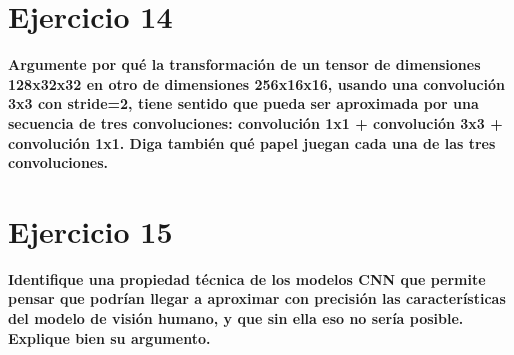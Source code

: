 \documentclass[11pt,a4paper]{article}
\begin{document}
\section*{Ejercicio 14}

\textbf{Argumente por qué la transformación de un tensor de dimensiones 128x32x32 en otro de dimensiones 256x16x16, usando una convolución 3x3 con stride=2, tiene sentido
que pueda ser aproximada por una secuencia de tres convoluciones: convolución 1x1 + convolución 3x3 + convolución 1x1. Diga también qué papel juegan cada una de las tres
convoluciones.}




\section*{Ejercicio 15}

\textbf{Identifique una propiedad técnica de los modelos CNN que permite pensar que podrían llegar a aproximar con precisión las características del modelo de visión
humano, y que sin ella eso no sería posible. Explique bien su argumento.}
\end{document}
